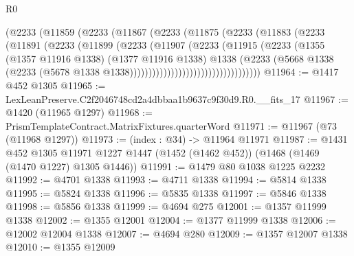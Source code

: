 \begin{lexlean}{R0}
\begin{coremodule}
                              (@2233
                                (@11859
                                  (@2233
                                    (@11867
                                      (@2233
                                        (@11875
                                          (@2233
                                            (@11883
                                              (@2233
                                                (@11891
                                                  (@2233
                                                    (@11899
                                                      (@2233
                                                        (@11907
                                                          (@2233
                                                            (@11915
                                                              (@2233
                                                                (@1355
                                                                  (@1357 @11916 @1338)
                                                                  (@1377 @11916 @1338)
                                                                  @1338
                                                                  (@2233
                                                                    (@5668
                                                                      @1338
                                                                      (@2233
                                                                        (@5678
                                                                          @1338
                                                                          @1338)))))))))))))))))))))))))))))))))))
@11964 := @1417 @452 @1305
@11965 := LexLeanPreserve.C2f2046748cd2a4dbbaa1b9637c9f30d9.R0.__fits_17
@11967 := @1420 (@11965 @1297)
@11968 := PrismTemplateContract.MatrixFixtures.quarterWord
@11971 := @11967 (@73 (@11968 @1297))
@11973 := (index : @34) -> @11964 @11971
@11987 := @1431
    @452
    @1305
    @11971
    @1227
    @1447
    (@1452 (@1462 @452))
    (@1468 (@1469 (@1470 @1227) @1305 @1446))
@11991 := @1479 @80 @1038 @1225 @2232
@11992 := @4701 @1338
@11993 := @4711 @1338
@11994 := @5814 @1338
@11995 := @5824 @1338
@11996 := @5835 @1338
@11997 := @5846 @1338
@11998 := @5856 @1338
@11999 := @4694 @275
@12001 := @1357 @11999 @1338
@12002 := @1355 @12001
@12004 := @1377 @11999 @1338
@12006 := @12002 @12004 @1338
@12007 := @4694 @280
@12009 := @1357 @12007 @1338
@12010 := @1355 @12009

\end{coremodule}
\end{lexlean}
